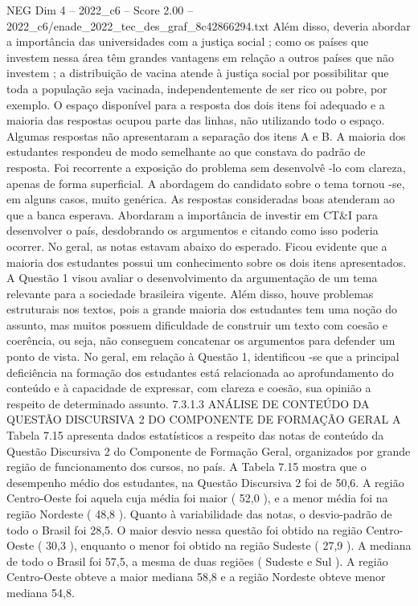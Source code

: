 \begin{textsample}{NEG Dim 4 – 2022\_c6 – Score 2.00 – 2022\_c6/enade\_2022\_tec\_des\_graf\_8c42866294.txt}
Além disso, deveria abordar a importância das universidades com a justiça social ; como os países que investem nessa área têm grandes vantagens em relação a outros países que não investem ; a distribuição de vacina atende à justiça social por possibilitar que toda a população seja vacinada, independentemente de ser rico ou pobre, por exemplo.
O espaço disponível para a resposta dos dois itens foi adequado e a maioria das respostas ocupou parte das linhas, não utilizando todo o espaço.
Algumas respostas não apresentaram a separação dos itens A e B.
A maioria dos estudantes respondeu de modo semelhante ao que constava do padrão de resposta.
Foi recorrente a exposição do problema sem desenvolvê -lo com clareza, apenas de forma superficial.
A abordagem do candidato sobre o tema tornou -se, em alguns casos, muito genérica.
As respostas consideradas boas atenderam ao que a banca esperava.
Abordaram a importância de investir em CT\&I para desenvolver o país, desdobrando os argumentos e citando como isso poderia ocorrer.
No geral, as notas estavam abaixo do esperado.
Ficou evidente que a maioria dos estudantes possui um conhecimento sobre os dois itens apresentados.
A Questão 1 visou avaliar o desenvolvimento da argumentação de um tema relevante para a sociedade brasileira vigente.
Além disso, houve problemas estruturais nos textos, pois a grande maioria dos estudantes tem uma noção do assunto, mas muitos possuem dificuldade de construir um texto com coesão e coerência, ou seja, não conseguem concatenar os argumentos para defender um ponto de vista.
No geral, em relação à Questão 1, identificou -se que a principal deficiência na formação dos estudantes está relacionada ao aprofundamento do conteúdo e à capacidade de expressar, com clareza e coesão, sua opinião a respeito de determinado assunto. 7.3.1.3 ANÁLISE DE CONTEÚDO DA QUESTÃO DISCURSIVA 2 DO COMPONENTE DE FORMAÇÃO GERAL A Tabela 7.15 apresenta dados estatísticos a respeito das notas de conteúdo da Questão Discursiva 2 do Componente de Formação Geral, organizados por grande região de funcionamento dos cursos, no país.
A Tabela 7.15 mostra que o desempenho médio dos estudantes, na Questão Discursiva 2 foi de 50,6.
A região Centro-Oeste foi aquela cuja média foi maior ( 52,0 ), e a menor média foi na região Nordeste ( 48,8 ).
Quanto à variabilidade das notas, o desvio-padrão de todo o Brasil foi 28,5.
O maior desvio nessa questão foi obtido na região Centro-Oeste ( 30,3 ), enquanto o menor foi obtido na região Sudeste ( 27,9 ).
A mediana de todo o Brasil foi 57,5, a mesma de duas regiões ( Sudeste e Sul ).
A região Centro-Oeste obteve a maior mediana 58,8 e a região Nordeste obteve menor mediana 54,8.

\end{textsample}
